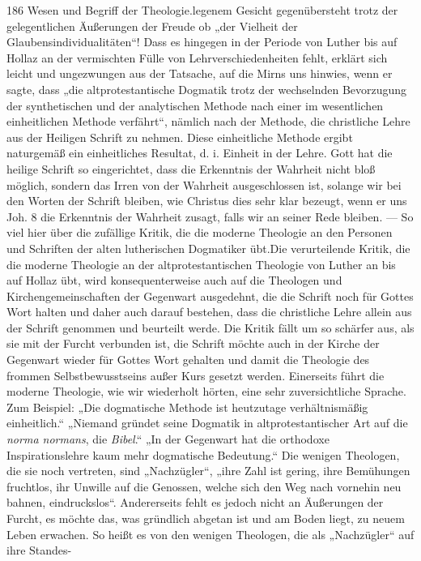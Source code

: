 186 \quad Wesen und Begriff der Theologie.legenem Gesicht gegenübersteht trotz der gelegentlichen Äußerungen der Freude ob „der Vielheit der Glaubensindividualitäten“! Dass es hingegen in der Periode von Luther bis auf Hollaz an der vermischten Fülle von Lehrverschiedenheiten fehlt, erklärt sich leicht und ungezwungen aus der Tatsache, auf die Mirns uns hinwies, wenn er sagte, dass „die altprotestantische Dogmatik trotz der wechselnden Bevorzugung der synthetischen und der analytischen Methode nach einer im wesentlichen einheitlichen Methode verfährt“, nämlich nach der Methode, die christliche Lehre aus der Heiligen Schrift zu nehmen. Diese einheitliche Methode ergibt naturgemäß ein einheitliches Resultat, d. i. Einheit in der Lehre. Gott hat die heilige Schrift so eingerichtet, dass die Erkenntnis der Wahrheit nicht bloß möglich, sondern das Irren von der Wahrheit ausgeschlossen ist, solange wir bei den Worten der Schrift bleiben, wie Christus dies sehr klar bezeugt, wenn er uns Joh. 8 die Erkenntnis der Wahrheit zusagt, falls wir an seiner Rede bleiben. — So viel hier über die zufällige Kritik, die die moderne Theologie an den Personen und Schriften der alten lutherischen Dogmatiker übt.Die verurteilende Kritik, die die moderne Theologie an der altprotestantischen Theologie von Luther an bis auf Hollaz übt, wird konsequenterweise auch auf die Theologen und Kirchengemeinschaften der Gegenwart ausgedehnt, die die Schrift noch für Gottes Wort halten und daher auch darauf bestehen, dass die christliche Lehre allein aus der Schrift genommen und beurteilt werde. Die Kritik fällt um so schärfer aus, als sie mit der Furcht verbunden ist, die Schrift möchte auch in der Kirche der Gegenwart wieder für Gottes Wort gehalten und damit die Theologie des frommen Selbstbewusstseins außer Kurs gesetzt werden. Einerseits führt die moderne Theologie, wie wir wiederholt hörten, eine sehr zuversichtliche Sprache. Zum Beispiel: „Die dogmatische Methode ist heutzutage verhältnismäßig einheitlich.“ „Niemand gründet seine Dogmatik in altprotestantischer Art auf die \emph{norma normans}, die \emph{Bibel}.“ „In der Gegenwart hat die orthodoxe Inspirationslehre kaum mehr dogmatische Bedeutung.“ Die wenigen Theologen, die sie noch vertreten, sind „Nachzügler“, „ihre Zahl ist gering, ihre Bemühungen fruchtlos, ihr Unwille auf die Genossen, welche sich den Weg nach vornehin neu bahnen, eindruckslos“. Andererseits fehlt es jedoch nicht an Äußerungen der Furcht, es möchte das, was gründlich abgetan ist und am Boden liegt, zu neuem Leben erwachen. So heißt es von den wenigen Theologen, die als „Nachzügler“ auf ihre Standes-